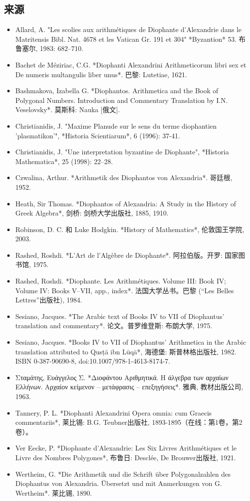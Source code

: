 \subsection{来源}
\begin{itemize}
\item Allard, A. "Les scolies aux arithmétiques de Diophante d'Alexandrie dans le Matritensis Bibl. Nat. 4678 et les Vatican Gr. 191 et 304" *Byzantion* 53. 布鲁塞尔, 1983: 682–710.  
\item Bachet de Méziriac, C.G. *Diophanti Alexandrini Arithmeticorum libri sex et De numeris multangulis liber unus*. 巴黎: Lutetiae, 1621.  
\item Bashmakova, Izabella G. *Diophantos. Arithmetica and the Book of Polygonal Numbers. Introduction and Commentary Translation by I.N. Veselovsky*. 莫斯科: Nauka [俄文].  
\item Christianidis, J. "Maxime Planude sur le sens du terme diophantien 'plasmatikon'", *Historia Scientiarum*, 6 (1996): 37-41.  
\item Christianidis, J. "Une interpretation byzantine de Diophante", *Historia Mathematica*, 25 (1998): 22–28.  
\item Czwalina, Arthur. *Arithmetik des Diophantos von Alexandria*. 哥廷根, 1952.  
\item Heath, Sir Thomas. *Diophantos of Alexandria: A Study in the History of Greek Algebra*, 剑桥: 剑桥大学出版社, 1885, 1910.  
\item Robinson, D. C. 和 Luke Hodgkin. *History of Mathematics*, 伦敦国王学院, 2003.  
\item Rashed, Roshdi. *L’Art de l’Algèbre de Diophante*. 阿拉伯版。开罗: 国家图书馆, 1975.  
\item Rashed, Roshdi. *Diophante. Les Arithmétiques. Volume III: Book IV; Volume IV: Books V–VII, app., index*. 法国大学丛书。巴黎 (“Les Belles Lettres”出版社), 1984.  
\item Sesiano, Jacques. *The Arabic text of Books IV to VII of Diophantus’ translation and commentary*. 论文。普罗维登斯: 布朗大学, 1975.  
\item Sesiano, Jacques. *Books IV to VII of Diophantus’ Arithmetica in the Arabic translation attributed to Qusṭā ibn Lūqā*, 海德堡: 斯普林格出版社, 1982. ISBN 0-387-90690-8, doi:10.1007/978-1-4613-8174-7.  
\item Σταμάτης, Ευάγγελος Σ. *Διοφάντου Αριθμητικά. Η άλγεβρα των αρχαίων Ελλήνων. Αρχαίον κείμενον – μετάφρασις – επεξηγήσεις*. 雅典, 教材出版公司, 1963.  
\item Tannery, P. L. *Diophanti Alexandrini Opera omnia: cum Graecis commentariis*, 莱比锡: B.G. Teubner出版社, 1893-1895（在线：第1卷，第2卷）。  
\item Ver Eecke, P. *Diophante d’Alexandrie: Les Six Livres Arithmétiques et le Livre des Nombres Polygones*, 布鲁日: Desclée, De Brouwer出版社, 1921.  
\item Wertheim, G. *Die Arithmetik und die Schrift über Polygonalzahlen des Diophantus von Alexandria. Übersetzt und mit Anmerkungen von G. Wertheim*. 莱比锡, 1890.
\end{itemize}